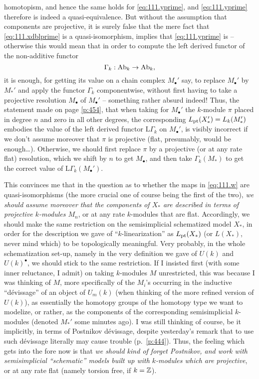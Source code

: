 homotopism, and hence the same holds for \eqref{eq:111.yprime}, and
\eqref{eq:111.yprime} therefore is indeed a quasi-equivalence. But
without the assumption that components are projective, it is surely
false that the mere fact that \eqref{eq:111.xdblprime} is a
quasi-isomorphism, implies that \eqref{eq:111.yprime} is -- otherwise
this would mean that in order to compute the left derived functor of
the non-additive functor
\[\Gamma_k:\operatorname{Ab}_k\to\operatorname{Ab}_k,\]
it is enough, for getting its value on a chain complex $M_\bullet'$
say, to replace $M_\bullet'$ by $M_*'$ and apply the functor
$\Gamma_k$ componentwise, without first having to take a projective
resolution $M_\bullet$ of $M_\bullet'$ -- something rather absurd
indeed! Thus, the statement made on page \ref{p:454}, that when taking
for $M_\bullet'$ the $k$-module $\pi$ placed in degree $n$ and zero in
all other degrees, the corresponding $L_{\mathrm{pt}}(X_*')=L_k(M_*')$
embodies the value of the left derived functor $\mathrm L\Gamma_k$ on
$M_\bullet'$, is visibly incorrect if we don't assume moreover that
$\pi$ is projective (flat, presumably, would be
enough\dots). Otherwise, we should first replace $\pi$ by a projective
(or at any rate flat) resolution, which we shift by $n$ to get
$M_\bullet$, and then take $\Gamma_k(M_*)$ to get the correct value of
$\mathrm L\Gamma_k(M_\bullet')$.

This convinces me that in the question as to whether the maps in
\eqref{eq:111.w} are quasi-isomorphisms (the more crucial one of
course being the first of the two), \emph{we should assume moreover
  that the components of $X_*$ are described in terms of
  \emph{projective} $k$-modules $M_n$}, or at any rate $k$-modules
that are flat. Accordingly, we should make the same restriction on the
semisimplicial schematized model $X_*$, in order for the description
we gave of ``$k$-linearization'' as $L_{\mathrm{pt}}(X_*)$ (or $L(X_*)$, never
mind which) to be topologically meaningful. Very probably, in the
whole schematization set-up, namely in the very definition we gave of
$U(k)$ and $U(k)^\bullet$, we should stick to the same restriction. If
I insisted first (with some inner reluctance, I admit) on taking
$k$-modules $M$ unrestricted, this was because I was thinking of $M$,
more specifically of the $M_i$'s occurring in the inductive
``dévissage'' of an object of $U_m(k)$ (when thinking of the more
refined version of $U(k)$), as essentially the homotopy groups of the
homotopy type we want to modelize, or rather, as the components of the
corresponding semisimplicial $k$-modules (denoted $M_*'$ some minutes
ago). I was still thinking of course, be it implicitly, in terms of
Postnikov dévissage, despite yesterday's remark that to use such
dévissage literally may cause trouble (p.\ \ref{p:444}). Thus, the
feeling which gets into the fore now is that \emph{we should kind of
  forget Postnikov, and work with semisimplicial ``schematic'' models
  built up with $k$-modules which are \emph{projective}}, or at any
rate flat (namely torsion free, if $k={\mathbb{Z}}$).

